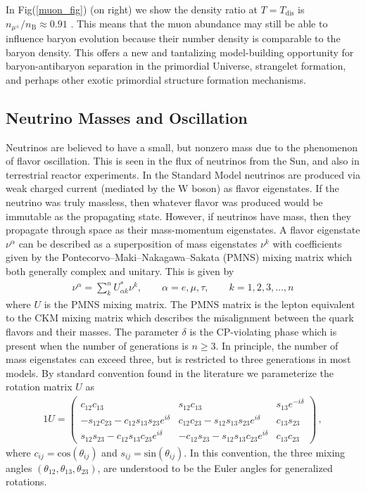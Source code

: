 \documentclass[universe,article,submit,moreauthors,pdftex,a4paper]{Definitions/mdpi}
\begin{document}
In Fig(\ref{muon_fig}) (on right) we show the density ratio at $T=T_\mathrm{dis}$ is $n_{\mu^\pm}/n_\mathrm{B}\approx0.91$ \cite{Yang:2021bko} . This means that the muon abundance may still be able to influence baryon evolution because their number density is comparable to the baryon density. This offers a new and tantalizing model-building opportunity for  baryon-antibaryon separation in the primordial Universe, strangelet formation, and perhaps other exotic primordial structure formation mechanisms.

\subsection{Neutrino Masses and Oscillation} \label{sec:Neutrinos}
\noindent Neutrinos are believed to have a small, but nonzero mass due to the phenomenon of flavor oscillation. This is seen in the flux of neutrinos from the Sun, and also in terrestrial reactor experiments. In the Standard Model neutrinos are produced via weak charged current (mediated by the W boson) as flavor eigenstates. If the neutrino was truly massless, then whatever flavor was produced would be immutable as the propagating state. However, if neutrinos have mass, then they propagate through space as their mass-momentum eigenstates. A flavor eigenstate $\nu^{\alpha}$ can be described as a superposition of mass eigenstates $\nu^{k}$ with coefficients given by the Pontecorvo–Maki–Nakagawa–Sakata (PMNS) mixing matrix which both generally complex and unitary. This is given by
\begin{align}\label{NuFlavors}
	\nu^{\alpha}=\sum_k^nU^\ast_{\alpha k}\nu^{k}, \qquad\alpha=e,\mu,\tau,\qquad k=1,2,3,\dots,n
\end{align}
where $U$ is the PMNS mixing matrix. The PMNS matrix is the lepton equivalent to the CKM mixing matrix which describes the misalignment between the quark flavors and their masses. The parameter $\delta$ is the CP-violating phase which is present when the number of generations is $n\geq3$. In principle, the number of mass eigenstates can exceed three, but is restricted to three generations in most models. By standard convention found in the literature we parameterize the rotation matrix $U$ as
	\begin{alignat}{1}
  	\label{PMNS} U =
		\begin{pmatrix}
			c_{12}c_{13} & s_{12}c_{13} & s_{13}e^{-i\delta}\\
			-s_{12}c_{23} - c_{12}s_{13}s_{23}e^{i\delta} & c_{12}c_{23} - s_{12}s_{13}s_{23}e^{i\delta} & c_{13}s_{23}\\
			s_{12}s_{23} - c_{12}s_{13}c_{23}e^{i\delta}& -c_{12}s_{23} - s_{12}s_{13}c_{23}e^{i\delta} & c_{13}c_{23}
		\end{pmatrix}\,,
	\end{alignat}
where $c_{ij} = \mathrm{cos}(\theta_{ij})$ and $s_{ij} = \mathrm{sin}(\theta_{ij})$. In this convention, the three mixing angles $(\theta_{12}, \theta_{13}, \theta_{23})$, are understood to be the Euler angles for generalized rotations.
\end{document}

